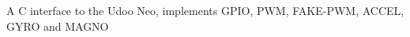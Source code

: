 A C interface to the Udoo Neo, implements G\-P\-I\-O, P\-W\-M, F\-A\-K\-E-\/\-P\-W\-M, A\-C\-C\-E\-L, G\-Y\-R\-O and M\-A\-G\-N\-O 